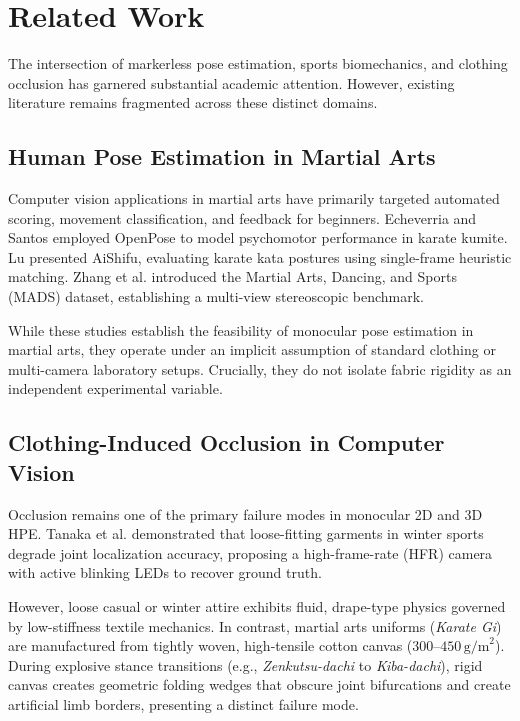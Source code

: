 \section{Related Work}
\label{sec:related_work}

The intersection of markerless pose estimation, sports biomechanics, and clothing occlusion has garnered substantial academic attention. However, existing literature remains fragmented across these distinct domains.

\subsection{Human Pose Estimation in Martial Arts}
Computer vision applications in martial arts have primarily targeted automated scoring, movement classification, and feedback for beginners. Echeverria and Santos \cite{echeverria2021modeling} employed OpenPose to model psychomotor performance in karate kumite. Lu \cite{lu2022aishifu} presented AiShifu, evaluating karate kata postures using single-frame heuristic matching. Zhang et al. \cite{zhang2017martial} introduced the Martial Arts, Dancing, and Sports (MADS) dataset, establishing a multi-view stereoscopic benchmark. 

While these studies establish the feasibility of monocular pose estimation in martial arts, they operate under an implicit assumption of standard clothing or multi-camera laboratory setups. Crucially, they do not isolate fabric rigidity as an independent experimental variable.

\subsection{Clothing-Induced Occlusion in Computer Vision}
Occlusion remains one of the primary failure modes in monocular 2D and 3D HPE. Tanaka et al. \cite{looseclothes2022hfr} demonstrated that loose-fitting garments in winter sports degrade joint localization accuracy, proposing a high-frame-rate (HFR) camera with active blinking LEDs to recover ground truth. 

However, loose casual or winter attire exhibits fluid, drape-type physics governed by low-stiffness textile mechanics. In contrast, martial arts uniforms (\textit{Karate Gi}) are manufactured from tightly woven, high-tensile cotton canvas ($300$--$450\,\text{g/m}^2$). During explosive stance transitions (e.g., \textit{Zenkutsu-dachi} to \textit{Kiba-dachi}), rigid canvas creates geometric folding wedges that obscure joint bifurcations and create artificial limb borders, presenting a distinct failure mode.

